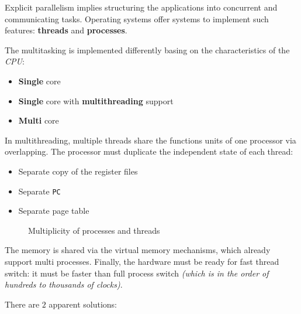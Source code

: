 \documentclass[english]{article}
\begin{document}
Explicit parallelism implies structuring the applications into concurrent and communicating tasks.
Operating systems offer systems to implement such features: \textbf{threads} and \textbf{processes}.

The multitasking is implemented differently basing on the characteristics of the \textit{CPU}:

\begin{itemize}
  \item \textbf{Single} core
  \item \textbf{Single} core with \textbf{multithreading} support
  \item \textbf{Multi} core
\end{itemize}

In multithreading, multiple threads share the functions units of one processor via overlapping.
The processor must duplicate the independent state of each thread:

\begin{itemize}
  \item Separate copy of the register files
  \item Separate \texttt{PC}
  \item Separate page table
\end{itemize}

\begin{figure}[htbp]
  \bigskip
  \centering
  \caption{Multiplicity of processes and threads}
  \label{fig:multiplicity-of-processes-and-threads}
  \bigskip
\end{figure}

The memory is shared via the virtual memory mechanisms, which already support multi processes.
Finally, the hardware must be ready for fast thread switch: it must be faster than full process switch \textit{(which is in the order of hundreds to thousands of clocks)}.

There are \(2\) apparent solutions:
\end{document}
